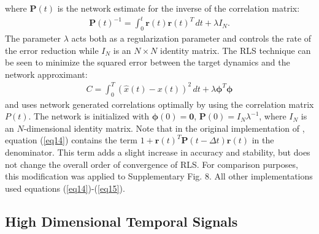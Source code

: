 \documentclass[11pt]{article} %
\begin{document}
where $\bm{P}(t)$ is the network estimate for the inverse of the correlation matrix:
\begin{eqnarray}
\bm{P}(t)^{-1} = \int_{0}^t \bm r(t) \bm r(t)^T \,dt + \lambda I_N .
\end{eqnarray}
The parameter $\lambda$ acts both as a regularization parameter \cite{haykin} 
and controls the rate of the error reduction while $I_N$ is an $N\times N$ identity matrix.  
The RLS technique can be seen to minimize the squared error between 
the target dynamics and the network approximant:
\begin{eqnarray}
C = \int_0^T(\hat{x}(t)-x(t))^2\,dt + \lambda \bm{\phi}^T \bm{\phi}  
\end{eqnarray}
and uses network generated correlations optimally by using the correlation matrix $P(t)$.  
The network is initialized with $\bm{\phi}(0) = \bm 0$, $\bm P(0) = I_N\lambda^{-1}$, 
where $I_N$ is an $N$-dimensional identity matrix.  
Note that in the original implementation of \cite{FORCE1}, 
equation (\ref{eq14}) contains the term $1+\bm r(t)^T \bm P(t-\Delta t) \bm r(t)$ in the denominator.  
This term adds a slight increase in accuracy and stability, but does not change 
the overall order of convergence of RLS.  
For comparison purposes, this modification was applied to Supplementary Fig. 8.  
All other implementations used equations (\ref{eq14})-(\ref{eq15}).   


\subsection*{High Dimensional Temporal Signals} 
\end{document}
